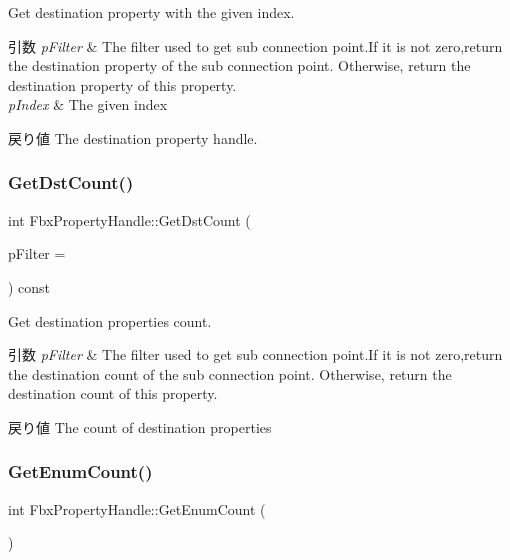 Get destination property with the given index. 
\begin{DoxyParams}{引数}
{\em p\+Filter} & The filter used to get sub connection point.\+If it is not zero,return the destination property of the sub connection point. Otherwise, return the destination property of this property. \\
\hline
{\em p\+Index} & The given index \\
\hline
\end{DoxyParams}
\begin{DoxyReturn}{戻り値}
The destination property handle. 
\end{DoxyReturn}
\mbox{\label{class_fbx_property_handle_a68e17d22df7c1a31bf4314ecef210b8b}} 
\subsubsection{\texorpdfstring{Get\+Dst\+Count()}{GetDstCount()}}
{\footnotesize\ttfamily int Fbx\+Property\+Handle\+::\+Get\+Dst\+Count (\begin{DoxyParamCaption}\item[{\hyperlink{class_fbx_connection_point_filter}{Fbx\+Connection\+Point\+Filter} $\ast$}]{p\+Filter = {} }\end{DoxyParamCaption}) const}

Get destination properties\textquotesingle{} count. 
\begin{DoxyParams}{引数}
{\em p\+Filter} & The filter used to get sub connection point.\+If it is not zero,return the destination count of the sub connection point. Otherwise, return the destination count of this property. \\
\hline
\end{DoxyParams}
\begin{DoxyReturn}{戻り値}
The count of destination properties 
\end{DoxyReturn}
\mbox{\label{class_fbx_property_handle_a2402b4e7a56046ebb4f1b941a447b197}} 
\subsubsection{\texorpdfstring{Get\+Enum\+Count()}{GetEnumCount()}}
{\footnotesize\ttfamily int Fbx\+Property\+Handle\+::\+Get\+Enum\+Count (\begin{DoxyParamCaption}{ }\end{DoxyParamCaption})}

